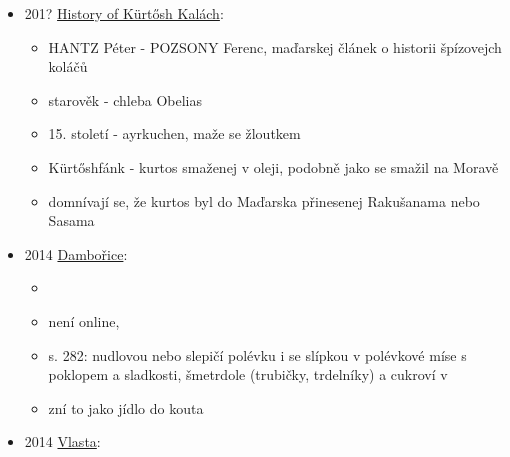 \begin{itemize}
\begin{itemize}
    Ve druhé polovině 20. století, po ideologickém uvolnění v Rumunsku v
    roce 1968, se kürtős postupně rozšířil i do oblastí mimo
    Sedmihradsko, především do pobřežních a horských turistických
    center. Po rumunském systémovém převratu v roce 1989 se jím nabízeli
    především turisté z Maďarska, kteří navštěvovali sedmihradské
    vesnice, a zároveň se stal oblíbeným, symbolickým koláčem stále
    populárnějších místních slavností.
  \item
    Obyvatelé Szentivánlaborfalva vyrobili 14 metrů dlouhý koláč. V roce
    2011 na místní slavnosti v Oroszfalu, která se nachází v sousedství
    Kézdivásárhely, upekli na žhavém uhlí na venkovním ohništi kürtős
    dlouhý už 16,8 metru.
  \item
    The early form of Kürtősh Kalách was imported to Hungarian --
    speaking regions via Austrians and Saxons.
  \end{itemize}
\item
  201?
  \href{https://web.archive.org/web/20201230125626/http://kurtos.eu/history}{History
  of Kürtősh Kalách}:

  \begin{itemize}
  \tightlist
  \item
    HANTZ Péter - POZSONY Ferenc, maďarskej článek o historii špízovejch
    koláčů
  \item
    starověk - chleba Obelias
  \item
    15. století - ayrkuchen, maže se žloutkem
  \item
    Kürtőshfánk - kurtos smaženej v oleji, podobně jako se smažil na
    Moravě
  \item
    domnívají se, že kurtos byl do Maďarska přinesenej Rakušanama nebo
    Sasama
  \end{itemize}
\item
  2014
  \href{https://www.digitalniknihovna.cz/mzk/uuid/uuid:8746eab0-e03e-11ee-8ea1-5ef3fc9bb22f}{Dambořice}:

  \begin{itemize}
  \tightlist
  \item
  \item
    není online, 
  \item
    s. 282: nudlovou nebo slepičí polévku i se slípkou v polévkové míse
    s poklopem a sladkosti, šmetrdole (trubičky, trdelníky) a cukroví v
  \item
    zní to jako jídlo do kouta
  \end{itemize}
\item
  2014
  \href{https://www.digitalniknihovna.cz/mzk/uuid/uuid:c4778b60-6850-11e6-a9cc-005056825209}{Vlasta}:


\end{itemize}
